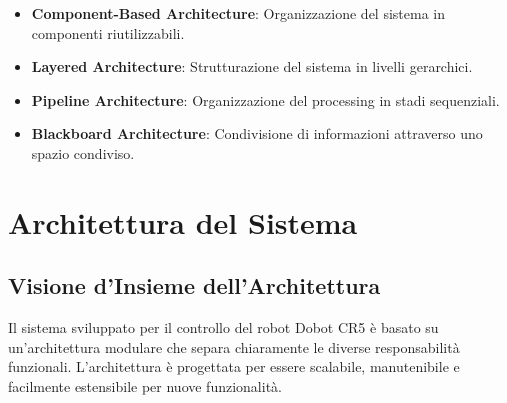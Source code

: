 \documentclass[12pt,a4paper,twoside,openright]{book}
\begin{document}
\begin{itemize}
    \item \textbf{Component-Based Architecture}: Organizzazione del sistema in componenti riutilizzabili.
    \item \textbf{Layered Architecture}: Strutturazione del sistema in livelli gerarchici.
    \item \textbf{Pipeline Architecture}: Organizzazione del processing in stadi sequenziali.
    \item \textbf{Blackboard Architecture}: Condivisione di informazioni attraverso uno spazio condiviso.
\end{itemize}

\chapter{Architettura del Sistema}
\label{chap:architettura}

\section{Visione d'Insieme dell'Architettura}

Il sistema sviluppato per il controllo del robot Dobot CR5 è basato su un'architettura modulare che separa chiaramente le diverse responsabilità funzionali. L'architettura è progettata per essere scalabile, manutenibile e facilmente estensibile per nuove funzionalità.
\end{document}
